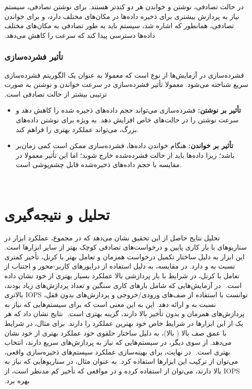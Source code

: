 ‫در حالت تصادفی، نوشتن و خواندن هر دو کندتر هستند. برای نوشتن تصادفی، سیستم نیاز به پردازش بیشتری برای ذخیره داده‌ها در مکان‌های مختلف دارد، و برای خواندن تصادفی، همانطور که اشاره شد، سیستم باید به طور تصادفی به مکان‌های مختلف داده‌ها دسترسی پیدا کند که سرعت را کاهش می‌دهد.
‫
‫\subsubsection*{تأثیر فشرده‌سازی}
‫فشرده‌سازی در آزمایش‌ها از نوع  است که معمولا به عنوان یک الگوریتم فشرده‌سازی سریع شناخته می‌شود. معمولا تأثیر فشرده‌سازی در سرعت خواندن و نوشتن به صورت ترتیبی بیشتر از حالت تصادفی است.
‫\begin{itemize}
‫    \item \textbf{تأثیر بر نوشتن:} فشرده‌سازی می‌تواند حجم داده‌های ذخیره شده را کاهش دهد و سرعت نوشتن را در حالت‌های خاص افزایش دهد. به ویژه برای نوشتن داده‌های بزرگ، می‌تواند عملکرد بهتری را فراهم کند.
‫    \item \textbf{تأثیر بر خواندن:} هنگام خواندن داده‌ها، فشرده‌سازی ممکن است کمی زمان‌بر باشد؛ زیرا داده‌ها باید از حالت فشرده‌شده خارج شوند؛ اما این تأثیر معمولا در مقایسه با حجم داده‌های ذخیره‌شده قابل چشم‌پوشی است.
‫\end{itemize}
‫
‫\section*{تحلیل و نتیجه‌گیری}
‫تحلیل نتایج حاصل از این تحقیق نشان می‌دهد که در مجموع، عملکرد ابزار  در سناریوهای با بار کاری پایین و درخواست‌های تصادفی کوچک بهتر از سایر ابزارها است. این ابزار به دلیل ساختار تکمیل درخواست همزمان و تعامل بهتر با کرنل، تأخیر کمتری نسبت به  و  دارد. در مقایسه،  به دلیل استفاده از درایورهای کاربر-محور و اجتناب از تعامل با کرنل، در شرایط با بار پردازشی بالا عملکرد بسیار بهتری از خود نشان داده است.
‫
‫در آزمایش‌هایی که شامل بارهای کاری سنگین و تعداد پردازش‌های زیاد بودند،  توانست با استفاده از صف‌های ورودی/خروجی و پردازش‌های بدون قفل، IOPS بالاتری نسبت به  و  ارائه دهد. این به این معنی است که برای سیستم‌هایی که نیاز به پردازش‌های همزمان و بدون تأخیر بالا دارند،  گزینه بهتری است.
‫
‫نتایج نشان داد که هر یک از این ابزارها در شرایط خاص خود بهترین عملکرد را دارند. برای مثال، در شرایط با عمق صف بالا ( بالا)،  به دلیل ساختار حلقوی خود عملکرد بهتری از خود نشان می‌دهد. از سوی دیگر، در سیستم‌هایی که نیاز به پردازش‌های سریع دارند،  انتخاب بهتری است.
‫
‫در نهایت، برای بهینه‌سازی عملکرد سیستم‌های ذخیره‌سازی واقعی، می‌توان از ترکیب این ابزارها استفاده کرد. به عنوان مثال، در سناریوهایی که نیاز به IOPS بالا دارند، می‌توان از  استفاده کرده و در مواقعی که تأخیر کم مدنظر است، از  بهره برد.
‫
‫
‫
‫